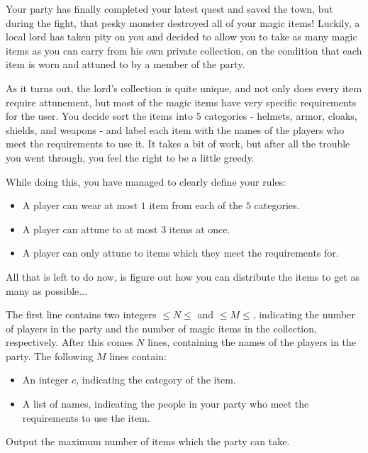 
Your party has finally completed your latest quest and saved the town, but during the fight, that pesky monster destroyed all of your magic items!
Luckily, a local lord has taken pity on you and decided to allow you to take as many magic items as you can carry from his own private collection, on the condition that each item is worn and attuned to by a member of the party.

As it turns out, the lord's collection is quite unique, and not only does every item require attunement, but most of the magic items have very specific requirements for the user.
You decide sort the items into $5$ categories - helmets, armor, cloaks, shields, and weapons - and label each item with the names of the players who meet the requirements to use it.
It takes a bit of work, but after all the trouble you went through, you feel the right to be a little greedy.

While doing this, you have managed to clearly define your rules:

\begin{itemize}
\item A player can wear at most $1$ item from each of the $5$ categories.
\item A player can attune to at most $3$ items at once.
\item A player can only attune to items which they meet the requirements for.
\end{itemize}

All that is left to do now, is figure out how you can distribute the items to get as many as possible...

\begin{Input}

The first line contains two integers $\leq N \leq$ and $\leq M \leq$, indicating the number of players in the party and the number of magic items in the collection, respectively.
After this comes $N$ lines, containing the names of the players in the party.
The following $M$ lines contain:

\begin{itemize}
\item An integer $c$, indicating the category of the item.
\item A list of names, indicating the people in your party who meet the requirements to use the item.
\end{itemize}
\end{Input}

\begin{Output}
    
Output the maximum number of items which the party can take.
\end{Output}